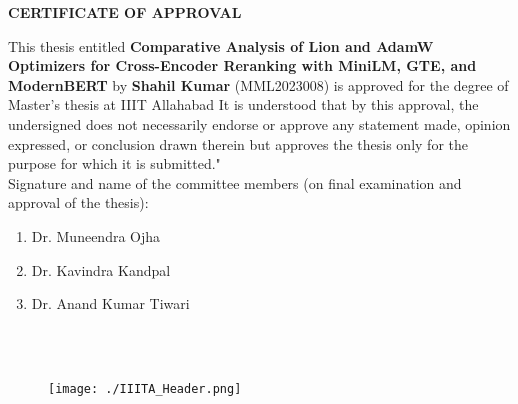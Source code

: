 \begin{spacing}{1.5}
\begin{center}
    {\centering\large\bfseries CERTIFICATE OF APPROVAL \par\vspace{10pt}}
\end{center}

 This thesis entitled \textbf{Comparative Analysis of Lion and AdamW Optimizers for Cross-Encoder Reranking with MiniLM, GTE, and ModernBERT}  by \textbf{Shahil Kumar} (MML2023008) is approved for the degree of Master's thesis at IIIT Allahabad  It is understood that by this approval, the undersigned does not necessarily endorse or approve any statement made, opinion expressed, or conclusion drawn therein but approves the thesis only for the purpose for which it is submitted."\\[40 pt]

 Signature and name of the committee members (on final examination and approval of the thesis): \\[10 pt]
 \begin{flushleft}
     \begin{enumerate}
         \item Dr. Muneendra Ojha \\[25pt]
         \item Dr. Kavindra Kandpal\\[25 pt]
         \item Dr. Anand Kumar Tiwari \\[25 pt]

     \end{enumerate}
 \end{flushleft}
 \vspace{20 pt}
 \begin{flushright}
     \begin{minipage}{0.5\textwidth}
        \flushright \vspace{60 pt}
        \underline{\hspace{6cm}} \\
         \\[80pt]
    \end{minipage}
 \end{flushright}
\end{spacing} 

\newpage
{}

\newpage
\begin{figure}[htp]
    \texttt{[image: ./IIITA\_Header.png]}
\end{figure}
\thispagestyle{empty}
\vspace{1mm}

